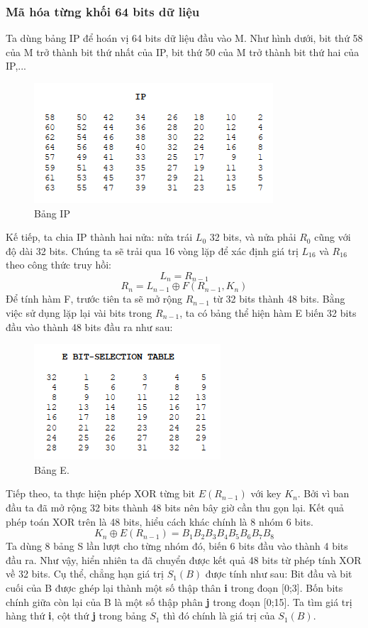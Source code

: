 \documentclass[a4paper]{article}
\begin{document}
\subsubsection{Mã hóa từng khối 64 bits dữ liệu}
Ta dùng bảng IP để hoán vị 64 bits dữ liệu đầu vào M. Như hình dưới, bit thứ 58 của M trở thành bit thứ nhất của IP, bit thứ 50 của M trở thành bit thứ hai của IP,...
\begin{figure}[htp]
    \centering
    \includegraphics{IP.png}
    \caption{Bảng IP}
    \label{fig:IP}
\end{figure}
Kế tiếp, ta chia IP thành hai nửa: nửa trái $L_0$ 32 bits, và nửa phải $R_0$ cũng với độ dài 32 bits. Chúng ta sẽ trải qua 16 vòng lặp để xác định giá trị $L_{16}$ và $R_{16}$ theo công thức truy hồi: \[L_n = R_{n-1}\]\[R_n = L_{n-1} \oplus F(R_{n-1},K_n)\]
Để tính hàm F, trước tiên ta sẽ mở rộng $R_{n-1}$ từ 32 bits thành 48 bits. Bằng việc sử dụng lặp lại vài bits trong $R_{n-1}$, ta có bảng thể hiện hàm E biến 32 bits đầu vào thành 48 bits đầu ra như sau:
\begin{figure}[htp]
    \centering
    \includegraphics{E.png}
    \caption{Bảng E.}
    \label{fig:E}
\end{figure}
Tiếp theo, ta thực hiện phép XOR từng bit $E(R_{n-1})$ với key $K_n$. Bởi vì ban đầu ta đã mở rộng 32 bits thành 48 bits nên bây giờ cần thu gọn lại. Kết quả phép toán XOR trên là 48 bits, hiểu cách khác chính là 8 nhóm 6 bits. \[K_n \oplus E(R_{n-1}) = B_1B_2B_3B_4B_5B_6B_7B_8\] Ta dùng 8 bảng S lần lượt cho từng nhóm đó, biến 6 bits đầu vào thành 4 bits đầu ra. Như vậy, hiển nhiên ta đã chuyển được kết quả 48 bits từ phép tính XOR về 32 bits. Cụ thể, chẳng hạn giá trị $S_1(B)$ được tính như sau: Bit đầu và bit cuối của B được ghép lại thành một số thập thân \textbf{i} trong đoạn [0;3]. Bốn bits chính giữa còn lại của B là một số thập phân \textbf{j} trong đoạn [0;15]. Ta tìm giá trị hàng thứ \textbf{i}, cột thứ \textbf{j} trong bảng $S_1$ thì đó chính là giá trị của $S_1(B)$.
\end{document}
